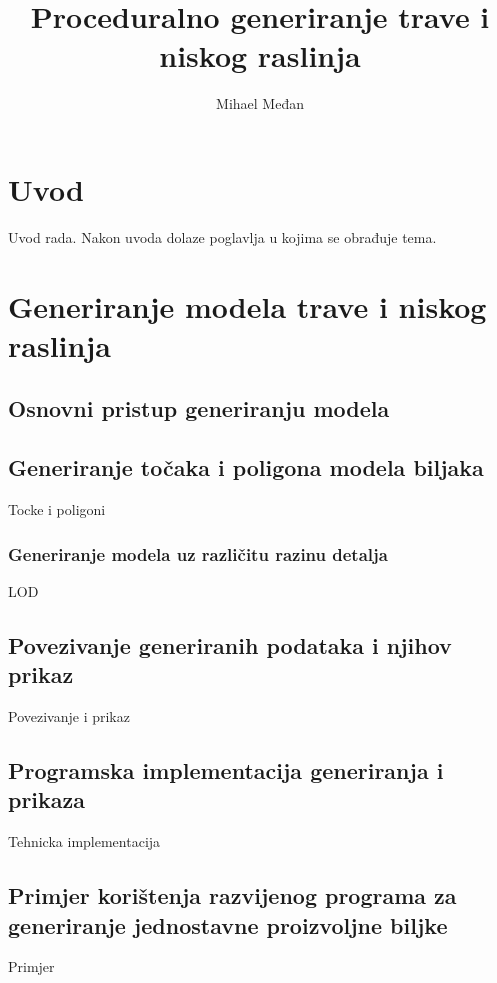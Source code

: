 \documentclass[times, utf8, diplomski]{fer}
\begin{document}

\title{Proceduralno generiranje trave i niskog raslinja}
\author{Mihael Međan}

\maketitle



\zahvala{}

\tableofcontents

\chapter{Uvod}
Uvod rada. Nakon uvoda dolaze poglavlja u kojima se obrađuje tema.

\chapter{Generiranje modela trave i niskog raslinja}
\section{Osnovni pristup generiranju modela}


\section{Generiranje točaka i poligona modela biljaka}
Tocke i poligoni

\subsection{Generiranje modela uz različitu razinu detalja}
LOD

\section{Povezivanje generiranih podataka i njihov prikaz}
Povezivanje i prikaz

\section{Programska implementacija generiranja i prikaza}
Tehnicka implementacija

\section{Primjer korištenja razvijenog programa za generiranje jednostavne proizvoljne biljke}
Primjer
\end{document}
